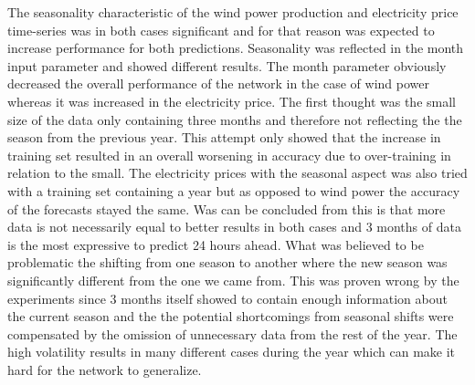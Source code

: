 The seasonality characteristic of the wind power production and electricity price time-series was in both cases significant and for that reason was expected to increase performance for both predictions. Seasonality was reflected in the month input parameter and showed different results. The month parameter obviously decreased the overall performance of the network in the case of wind power whereas it was increased in the electricity price. The first thought was the small size of the data only containing three months and therefore not reflecting the the season from the previous year. This attempt only showed that the increase in training set resulted in an overall worsening in accuracy due to over-training in relation to the small. The electricity prices with the seasonal aspect was also tried with a training set containing a year but as opposed to wind power the accuracy of the forecasts stayed the same. Was can be concluded from this is that more data is not necessarily equal to better results in both cases and 3 months of data is the most expressive to predict 24 hours ahead. What was believed to be problematic the shifting from one season to another where the new season was significantly different from the one we came from. This was proven wrong by the experiments since 3 months itself showed to contain enough information about the current season and the the potential shortcomings from seasonal shifts were compensated by the omission of unnecessary data from the rest of the year. The high volatility results in many different cases during the year which can make it hard for the network to generalize. 



  